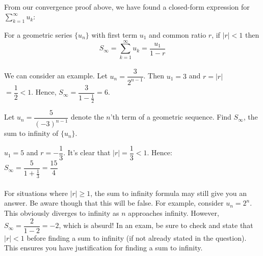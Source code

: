 \documentclass[12pt, a4paper, titlepage, twoside]{article}
\newcounter{excount}[subsection]
\begin{document}
	\paragraph{}
	From our convergence proof above, we have found a closed-form expression for $\displaystyle \sum_{k=1}^\infty u_k$:\\
	
	\begin{kp}
		For a geometric series $\{u_n\}$ with first term $u_1$ and common ratio $r$, if $|r| < 1$ then 
		$$S_{\infty} = \displaystyle \sum_{k=1}^\infty u_k = \dfrac{u_1}{1-r}$$
	\end{kp}
	
	\paragraph{}
	We can consider an example. Let $u_n = \dfrac{3}{2^{n-1}}$. Then $u_1 = 3$ and $r = |r|$\\ $=\dfrac{1}{2} < 1$. Hence,
	$S_{\infty} = \dfrac{3}{1-\frac{1}{2}} = 6$.\\
	
	\begin{ex}
		Let $u_n = \dfrac{5}{(-3)^{n-1}}$ denote the $n$'th term of a geometric sequence. Find $S_\infty$, the sum to infinity of 
		$\{u_n\}$.
		
		\hfill
		\tcbline
		\hfill
		
		$u_1 = 5$ and $r = -\dfrac{1}{3}$. It's clear that $|r| = \dfrac{1}{3} < 1$. Hence:\\
		
		$S_\infty = \dfrac{5}{1+\frac{1}{3}} = \dfrac{15}{4}$
	\end{ex}
	
	\paragraph{}
	For situations where $|r| \geq 1$, the sum to infinity formula may still give you an answer. Be aware though that this will be false.
	For example, consider $u_n = 2^n$. This obviously diverges to infinity as $n$ approaches infinity. However, $S_\infty = 
	\dfrac{2}{1-2} = -2$, which is absurd! In an exam, be sure to check and state that $|r| < 1$ before finding a sum to infinity (if not 
	already stated in the question). This ensures you have justification for finding a sum to infinity.\\
	
\end{document}
